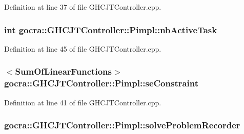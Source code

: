 Definition at line 37 of file G\+H\+C\+J\+T\+Controller.\+cpp.

\subsubsection[{\texorpdfstring{nb\+Active\+Task}{nbActiveTask}}]{\setlength{\rightskip}{0pt plus 5cm}int gocra\+::\+G\+H\+C\+J\+T\+Controller\+::\+Pimpl\+::nb\+Active\+Task}\hypertarget{structgocra_1_1GHCJTController_1_1Pimpl_acc8e0872a4a56af752e5556f8b5c83d5}{}\label{structgocra_1_1GHCJTController_1_1Pimpl_acc8e0872a4a56af752e5556f8b5c83d5}


Definition at line 45 of file G\+H\+C\+J\+T\+Controller.\+cpp.

\subsubsection[{\texorpdfstring{se\+Constraint}{seConstraint}}]{$<${\bf Sum\+Of\+Linear\+Functions}$>$ gocra\+::\+G\+H\+C\+J\+T\+Controller\+::\+Pimpl\+::se\+Constraint}\hypertarget{structgocra_1_1GHCJTController_1_1Pimpl_abbc7f37d47e968b025652ade01739ab8}{}\label{structgocra_1_1GHCJTController_1_1Pimpl_abbc7f37d47e968b025652ade01739ab8}


Definition at line 41 of file G\+H\+C\+J\+T\+Controller.\+cpp.

\subsubsection[{\texorpdfstring{solve\+Problem\+Recorder}{solveProblemRecorder}}]{ gocra\+::\+G\+H\+C\+J\+T\+Controller\+::\+Pimpl\+::solve\+Problem\+Recorder}\hypertarget{structgocra_1_1GHCJTController_1_1Pimpl_a949ca96a7b5a333e0594c6e6eda106a1}{}\label{structgocra_1_1GHCJTController_1_1Pimpl_a949ca96a7b5a333e0594c6e6eda106a1}


